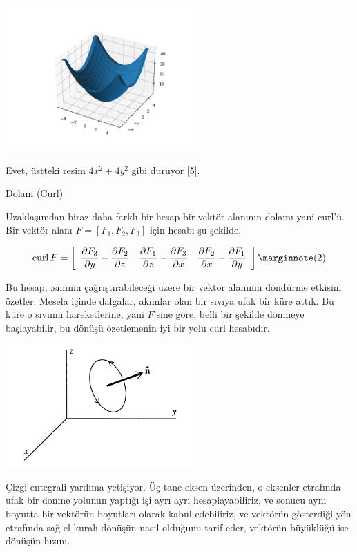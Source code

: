 \documentclass[12pt,fleqn]{article}\usepackage{../../common}
\begin{document}
\includegraphics[width=20em]{calc_multi_70_div_curl_lap_02.png}

Evet, üstteki resim $4 x^2 + 4 y^2$ gibi duruyor [5].

Dolam (Curl)

Uzaklaşımdan biraz daha farklı bir hesap bir vektör alanının dolamı yani
curl'ü. Bir vektör alanı $F = [F_1,F_2,F_3]$ için hesabı şu şekilde,

$$
\curl F = \left[\begin{array}{ccc} 
\dfrac{\partial F_3}{\partial y} - \dfrac{\partial F_2}{\partial z} & 
\dfrac{\partial F_1}{\partial z} - \dfrac{\partial F_3}{\partial x} & 
\dfrac{\partial F_2}{\partial x} - \dfrac{\partial F_1}{\partial y} 
\end{array}\right]
\mlabel{2}
$$

Bu hesap, isminin çağrıştırabileceği üzere bir vektör alanının döndürme etkisini
özetler. Mesela içinde dalgalar, akımlar olan bir sıvıya ufak bir küre attık. Bu
küre o sıvının hareketlerine, yani $F$'sine göre, belli bir şekilde dönmeye
başlayabilir, bu dönüşü özetlemenin iyi bir yolu curl hesabıdır.

\includegraphics[width=20em]{calc_multi_70_div_curl_lap_06.png}

Çizgi entegrali yardıma yetişiyor. Üç tane eksen üzerinden, o eksenler etrafında
ufak bir donme yolunun yaptığı işi ayrı ayrı hesaplayabiliriz, ve sonucu aynı
boyutta bir vektörün boyutları olarak kabul edebiliriz, ve vektörün gösterdiği
yön etrafında sağ el kuralı dönüşün nasıl olduğunu tarif eder, vektörün
büyüklüğü ise dönüşün hızını. 
\end{document}
